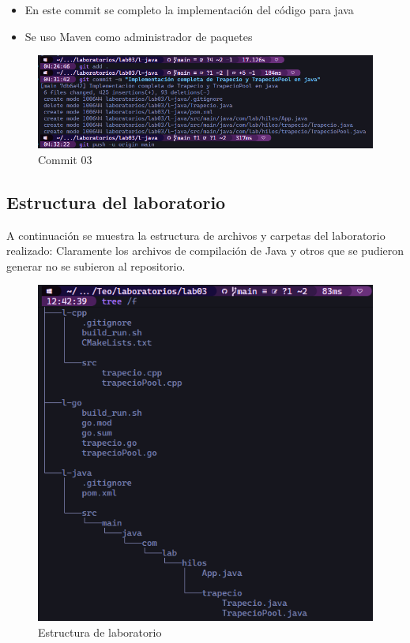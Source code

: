 \begin{itemize}
    \item En este commit se completo la implementación del código para java
    \item Se uso Maven como administrador de paquetes
\end{itemize}

\begin{figure}[H]
    \centering
    \includegraphics[width=0.8\linewidth]{img/commit03.png}
    \caption{Commit 03}
    \label{fig:placeholder}
\end{figure}


\subsection {Estructura del laboratorio}

A continuación se muestra la estructura de archivos y carpetas del laboratorio realizado:
Claramente los archivos de compilación de Java y otros que se pudieron generar no se subieron al repositorio.


\begin{figure}[H]
    \centering
    \includegraphics[width=0.8\linewidth]{img/estructura.png}
    \caption{Estructura de laboratorio}
    \label{fig:placeholder}
\end{figure}



